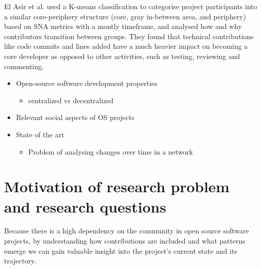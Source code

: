 El Asir et al. \cite{elasriPeripheryCoreTemporal2017} used a K-means classification to categorise project participants into a similar core-periphery structure (core, gray in-between area, and periphery) based on SNA metrics with a montly timeframe, and analysed how and why contributors transition between groups. They found that technical contributions like code commits and lines added have a much heavier impact on becoming a core developer as opposed to other activities, such as testing, reviewing and commenting. 

\begin{itemize}
    \item Open-source software development properties
    \begin{itemize}
        \item centralized vs decentralized

    \end{itemize}
    \item Relevant social aspects of OS projects
    \item State of the art
    \begin{itemize}
        \item Problem of analysing changes over time in a network
    \end{itemize}
\end{itemize}


\section{Motivation of research problem and research questions}
Because there is a high dependency on the community in open source software projects, by understanding how contributions are included and what patterns emerge we can gain valuable insight into the project's current state and its trajectory. \\

